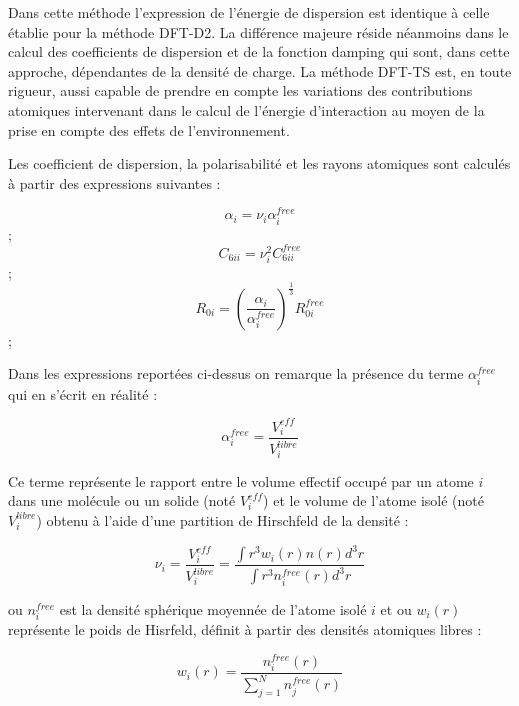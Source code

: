 Dans cette méthode l’expression de l'énergie de dispersion est identique à celle établie pour la méthode DFT-D2. La différence majeure réside néanmoins dans le calcul des coefficients de dispersion et de la fonction damping qui sont, dans cette approche, dépendantes de la densité de charge. La méthode DFT-TS est, en toute rigueur, aussi capable de prendre en compte les variations des contributions atomiques intervenant dans le calcul de l’énergie d’interaction au moyen de la prise en compte des effets de l’environnement. 

Les coefficient de dispersion, la polarisabilité et les rayons atomiques sont calculés à partir des expressions suivantes :

\begin{multicols}{3}
	\begin{equation} \alpha_{i} = \nu_{i} \alpha_{i}^{free} \end{equation};
	\begin{equation} C_{6ii} = \nu_{i}^{2} C_{6ii}^{free} \end{equation}; 
	\begin{equation} R_{0i} = \left(\frac{\alpha_{i}}{\alpha_{i}^{free}}\right)^{\frac{1}{3}} R_{0i}^{free} \end{equation}; 
\end{multicols}

Dans les expressions reportées ci-dessus on remarque la présence du terme $\alpha_{i}^{free}$ qui en s’écrit en réalité :

\begin{equation}
\alpha_{i}^{free} = \frac{V_{i}^{eff}}{V_{i}^{libre}}
\end{equation}

Ce terme représente le rapport entre le volume effectif occupé par un atome $i$ dans une molécule ou un solide (noté $V_{i}^{eff}$) et le volume de l’atome isolé (noté $V_{i}^{libre}$) obtenu à l’aide d’une partition de Hirschfeld de la densité :

\begin{equation}
\nu_{i} = \frac{V_{i}^{eff}}{V_{i}^{libre}} = \frac{\int r^{3} w_{i}(r)n(r)d^{3}r}{\int r^{3} n_{i}^{free} (r)d^{3}r}
\end{equation}

ou $n_{i}^{free}$ est la densité sphérique moyennée de l’atome isolé $i$ et ou $w_{i}(r)$ représente le poids de Hisrfeld, définit à partir des densités atomiques libres : 

\begin{equation}
w_{i}(r)= \frac{n_{i}^{free}(r)}{\sum_{j=1}^{N} n_{j}^{free}(r)}
\end{equation}
\bigskip

